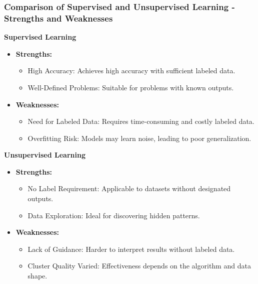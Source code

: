 \documentclass[aspectratio=169]{beamer}
\begin{document}
\begin{frame}[fragile]
    \frametitle{Comparison of Supervised and Unsupervised Learning - Strengths and Weaknesses}

    \textbf{Supervised Learning}\\
    \begin{itemize}
        \item \textbf{Strengths:}
        \begin{itemize}
            \item High Accuracy: Achieves high accuracy with sufficient labeled data.
            \item Well-Defined Problems: Suitable for problems with known outputs.
        \end{itemize}
        \item \textbf{Weaknesses:}
        \begin{itemize}
            \item Need for Labeled Data: Requires time-consuming and costly labeled data.
            \item Overfitting Risk: Models may learn noise, leading to poor generalization.
        \end{itemize}
    \end{itemize}
    \vfill
    \textbf{Unsupervised Learning}\\
    \begin{itemize}
        \item \textbf{Strengths:}
        \begin{itemize}
            \item No Label Requirement: Applicable to datasets without designated outputs.
            \item Data Exploration: Ideal for discovering hidden patterns.
        \end{itemize}
        \item \textbf{Weaknesses:}
        \begin{itemize}
            \item Lack of Guidance: Harder to interpret results without labeled data.
            \item Cluster Quality Varied: Effectiveness depends on the algorithm and data shape.
        \end{itemize}
    \end{itemize}
\end{frame}
\end{document}
